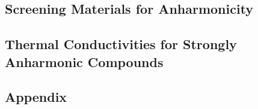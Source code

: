 \documentclass[nobib,a4paper,twoside,notoc,justified,marginals=justified]{tufte-book}
\begin{document}

\chapter{Screening Materials for Anharmonicity}


\chapter{Thermal Conductivities for Strongly Anharmonic Compounds}

%
%
%

\cleardoublepage
{}
{}






\begin{appendices}
  \part*{Appendix}
  
\end{appendices}

\end{document}
